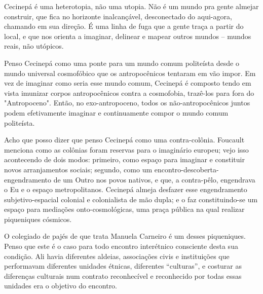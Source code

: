 Cecinepá é uma heterotopia, não uma utopia. Não é um mundo pra gente almejar construir, que fica no horizonte inalcançável, desconectado do aqui-agora, chamando em sua direção. É uma linha de fuga que a gente traça a partir do local, e que nos orienta a imaginar, delinear e mapear outros mundos -- mundos reais, não utópicos.

Penso Cecinepá como uma ponte para um mundo comum politeísta desde o mundo universal cosmofóbico que os antropocênicos tentaram em vão impor. Em vez de imaginar como seria esse mundo comum, Cecinepá é composto tendo em vista imunizar corpos antropocênicos contra a cosmofobia, trazê-los para fora do "Antropoceno". Então, no exo-antropoceno, todos os não-antropocênicos juntos podem efetivamente imaginar e continuamente compor o mundo comum politeísta.


Acho que posso dizer que penso Cecinepá como uma contra-colônia. Foucault menciona como as colônias foram reservas para o imaginário europeu; vejo isso acontecendo de dois modos: primeiro, como espaço para imaginar e constituir novos arranjamentos sociais; segundo, como um encontro-descoberta-engendramento de um Outro nos povos nativos, e que, a contra-pêlo, engendrava o Eu e o espaço metropolitanos. Cecinepá almeja desfazer esse engendramento subjetivo-espacial colonial e colonialista de mão dupla; e o faz constituindo-se um espaço para mediações onto-cosmológicas, uma praça pública na qual realizar piqueniques cósmicos.

O colegiado de pajés de que trata Manuela Carneiro é um desses piqueniques. Penso que este é o caso para todo encontro interétnico consciente desta sua condição. Ali havia diferentes aldeias, associações civis e instituições que performavam diferentes unidades étnicas, diferentes \enquote{culturas}, e costurar as diferenças culturais num contrato reconhecível e reconhecido por todas essas unidades era o objetivo do encontro.

